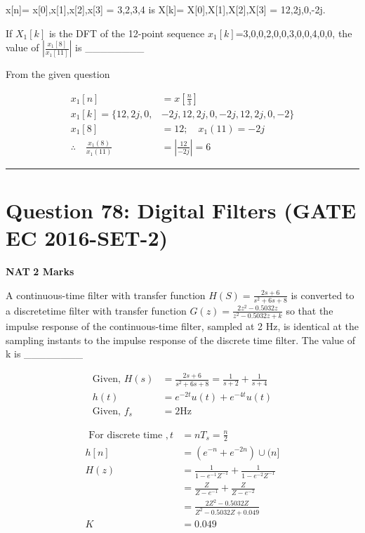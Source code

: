 \documentclass[11pt,a4paper]{article}
\begin{document}
 x[n]={ x[0],x[1],x[2],x[3] } = {3,2,3,4} is 
X[k]={ X[0],X[1],X[2],X[3] } = {12,2j,0,-2j}. 

If $X_{1}[k]$  is the DFT of the 12-point sequence  $x_{1}[k]$={3,0,0,2,0,0,3,0,0,4,0,0}, the value of  $|\frac{x_{1}[8]}{x_{1}[11]}|$ is \_\_\_\_\_\_\_\_


\begin{tcolorbox}[solbox, title=Detailed Solution -- Question 77]
From the given question

\[
\begin{aligned} x_{1}[n] &=x\left[\frac{n}{3}\right] \\ x_{1}[k]=\{12,2 j, 0,&-2 j, 12,2 j, 0,-2 j, 12,2 j, 0,-2\} \\ x_{1}[8] &=12 ; \quad x_{1}(11)=-2 j \\ \therefore \quad \frac{x_{1}(8)}{x_{1}(11)} &=\left|\frac{12}{-2 j}\right|=6 \end{aligned}
\]
\end{tcolorbox}

\vspace{1.5em}
\hrule
\vspace{1.5em}

\section*{Question 78: Digital Filters (GATE EC 2016-SET-2)}
\noindent \textbf{\color{primary}NAT} \hfill \textbf{\color{secondary}2 Marks}


\noindent A continuous-time filter with transfer function $H(S)=\frac{2s+6}{s^{2}+6s+8}$ is converted to a discretetime
filter with transfer function $G(z)=\frac{2z^{2}-0.5032z}{z^{2}-0.5032z+k}$ so that the impulse response of the
continuous-time filter, sampled at 2 Hz, is identical at the sampling instants to the impulse response of the discrete time filter. The value of k is \_\_\_\_\_\_\_\_


\begin{tcolorbox}[solbox, title=Detailed Solution -- Question 78]
\[
\begin{aligned} \text{Given, }H(s)&=\frac{2 s+6}{s^{2}+6 s+8}=\frac{1}{s+2}+\frac{1}{s+4} \\ h(t) &=e^{-2 t} u(t)+e^{-4 t} u(t) \\ \text{Given, }f_{s} &=2 \mathrm{Hz} \end{aligned}
\]

\[
\begin{aligned} \text { For discrete time }, t &=n T_{s}=\frac{n}{2} \\ h[n] &=\left(e^{-n}+e^{-2 n}\right) \cup(n] \\ H(z) &=\frac{1}{1-e^{-1} Z^{-1}}+\frac{1}{1-e^{-2} Z^{-1}} \\ &=\frac{Z}{Z-e^{-1}}+\frac{Z}{Z-e^{-2}} \\ &=\frac{2 Z^{2}-0.5032 Z}{Z^{2}-0.5032 Z+0.049} \\ K &=0.049 \end{aligned}
\]
\end{tcolorbox}
\end{document}
